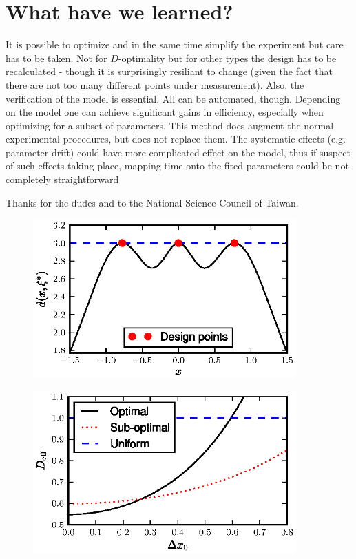 \documentclass[12pt]{iopart}
\begin{document}
\section{What have we learned?}

It is possible to optimize and in the same time simplify the experiment but care has to be taken. Not for $D$-optimality but for other types the design has to be recalculated - though it is surprisingly resiliant to change (given the fact that there are not too many different points under measurement). Also, the verification of the model is essential. All can be automated, though. Depending on the model one can achieve significant gains in efficiency, especially when optimizing for a subset of parameters. This method does augment the normal experimental procedures, but does not replace them. The systematic effects (e.g. parameter drift) could have more complicated effect on the model, thus if suspect of such effects taking place, mapping time onto the fited parameters could be not completely straightforward


\ack Thanks for the dudes and to the National Science Council of Taiwan.


\begin{figure}
\includegraphics[width=0.9\textwidth]{fig1.eps}
\end{figure}

\begin{figure}
\includegraphics[width=0.9\textwidth]{fig2.eps}
\end{figure}
\end{document}
